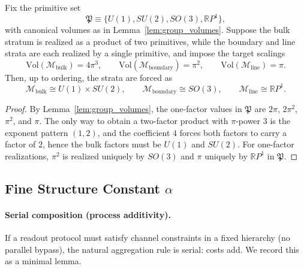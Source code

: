 \begin{proposition}
\label{prop:alpha_phase_factorization_rigidity}
Fix the primitive set
\begin{equation}
    \mathfrak{P}\equiv \{U(1),SU(2),SO(3),\mathbb{R}P^1\},
\end{equation}
with canonical volumes as in Lemma~\ref{lem:group_volumes}. Suppose the bulk stratum is realized as a product of two primitives, while the boundary and line strata are each realized by a single primitive, and impose the target scalings
\begin{equation}
    \mathrm{Vol}(\mathcal{M}_{\mathrm{bulk}})=4\pi^3,\qquad
    \mathrm{Vol}(\mathcal{M}_{\mathrm{boundary}})=\pi^2,\qquad
    \mathrm{Vol}(\mathcal{M}_{\mathrm{line}})=\pi.
\end{equation}
Then, up to ordering, the strata are forced as
\begin{equation}
    \mathcal{M}_{\mathrm{bulk}}\cong U(1)\times SU(2),\qquad
    \mathcal{M}_{\mathrm{boundary}}\cong SO(3),\qquad
    \mathcal{M}_{\mathrm{line}}\cong \mathbb{R}P^1.
\end{equation}
\end{proposition}
\begin{proof}
By Lemma~\ref{lem:group_volumes}, the one-factor values in $\mathfrak{P}$ are $2\pi$, $2\pi^2$, $\pi^2$, and $\pi$. The only way to obtain a two-factor product with $\pi$-power $3$ is the exponent pattern $(1,2)$, and the coefficient $4$ forces both factors to carry a factor of $2$, hence the bulk factors must be $U(1)$ and $SU(2)$. For one-factor realizations, $\pi^2$ is realized uniquely by $SO(3)$ and $\pi$ uniquely by $\mathbb{R}P^1$ in $\mathfrak{P}$.
\end{proof}

\subsection{Fine Structure Constant \texorpdfstring{$\alpha$}{alpha}}
\paragraph{Serial composition (process additivity).}
If a readout protocol must satisfy channel constraints in a fixed hierarchy (no parallel bypass), the natural aggregation rule is serial: costs add. We record this as a minimal lemma.

